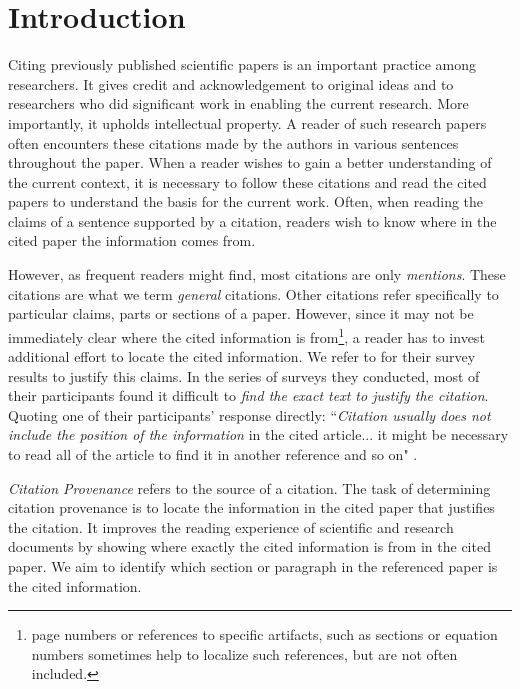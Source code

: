 \chapter{Introduction}
\label{introduction}
Citing previously published scientific papers is an important practice among researchers. It gives credit and acknowledgement to original ideas and to researchers who did significant work in enabling the current research.  More importantly, it upholds intellectual property. A reader of such research papers often encounters these citations made by the authors in various sentences throughout the paper. When a reader wishes to gain a better understanding of the current context, it is necessary to follow these citations and read the cited papers to understand the basis for the current work.  Often, when reading the claims of a sentence supported by a citation, readers wish to know where in the cited paper the information comes from.  

However, as frequent readers might find, most citations are only \textit{mentions}. These citations are what we term {\it general} citations. Other citations refer specifically to particular claims, parts or sections of a paper.   However, since it may not be immediately clear where the cited information is from\footnote{page numbers or references to specific artifacts, such as sections or equation numbers sometimes help to localize such references, but are not often included.}, a reader has to invest additional effort to locate the cited information. We refer to \cite{citation-sensitive} for their survey results to justify this claims. In the series of surveys they conducted, most of their participants found it difficult to \textit{find the exact text to justify the citation}. Quoting one of their participants' response directly: ``\textit{Citation usually does not include the position of the information} in the cited article... it might be necessary to read all of the article to find it in another reference and so on" \cite{citation-sensitive}.

{\it Citation Provenance} refers to the source of a citation. The task of determining citation provenance is to locate the information in the cited paper that justifies the citation. It improves the reading experience of scientific and research documents by showing where exactly the cited information is from in the cited paper. We aim to identify which section or paragraph in the referenced paper is the cited information. 

